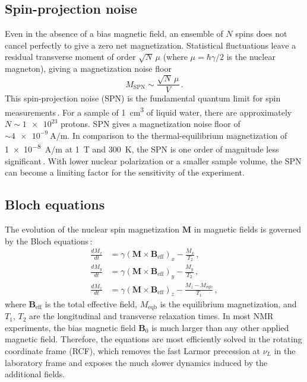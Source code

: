 \subsection{Spin-projection noise}\label{sec:intro:NMR:SPN}
Even in the absence of a bias magnetic field, an ensemble of $N$ spins does not cancel perfectly to give a zero net magnetization.
Statistical fluctuations leave a residual transverse moment of order $\sqrt{N}\,\mu$ (where $\mu = \hbar\gamma/2$ is the nuclear magneton), giving a magnetization noise floor
\begin{equation}
    M_\mathrm{SPN} \sim \frac{\sqrt{N}\,\mu}{V}
    \,.\label{eq:SPN}
\end{equation}
This spin-projection noise (SPN) is the fundamental quantum limit for spin measurements\,\cite{Bloch1946_NuclearInduction, Mitchell2020_MagSensors, Aybas_2021_Quantum_sensitivity}.
For a sample of \SI{1}{\centi\meter\cubed} of liquid water, there are approximately $N \sim \num{1e23}$ protons.
SPN gives a magnetization noise floor of $\sim \SI{4e-9}{\ampere/\meter}$.
In comparison to the thermal-equilibrium magnetization of \SI{1e-8}{\ampere/\meter} at \SI{1}{\tesla} and \SI{300}{\kelvin}, the SPN is one order of magnitude less significant\,\cite{Zhang2026_Dissertation_ipynb_1_introduction}.
With lower nuclear polarization or a smaller sample volume, the SPN can become a limiting factor for the sensitivity of the experiment.

\subsection{Bloch equations}\label{sec:intro:bloch_eq}
The evolution of the nuclear spin magnetization $\boldsymbol{M}$ in magnetic fields is governed by the Bloch equations\,\cite{Abragam1961_NuclearMagnetism}:
\begin{align}
    \frac{dM_x}{dt} &= \gamma\left(\boldsymbol{M}\times\boldsymbol{B}_\mathrm{eff}\right)_x - \frac{M_x}{T_2}
    \,,\label{eq:bloch_x}\\
    \frac{dM_y}{dt} &= \gamma\left(\boldsymbol{M}\times\boldsymbol{B}_\mathrm{eff}\right)_y - \frac{M_y}{T_2}
    \,,\label{eq:bloch_y}\\
    \frac{dM_z}{dt} &= \gamma\left(\boldsymbol{M}\times\boldsymbol{B}_\mathrm{eff}\right)_z - \frac{M_z-M_\mathrm{eqb}}{T_1}
    \,,\label{eq:bloch_z}
\end{align}
where $\boldsymbol{B}_\mathrm{eff}$ is the total effective field, $M_\mathrm{eqb}$ is the equilibrium magnetization, and $T_1$, $T_2$ are the longitudinal and transverse relaxation times.
In most NMR experiments, the bias magnetic field $\boldsymbol{B}_0$ is much larger than any other applied magnetic field.
Therefore, the equations are most efficiently solved in the rotating coordinate frame (RCF), which removes the fast Larmor precession at $\nu_L$ in the laboratory frame and exposes the much slower dynamics induced by the additional fields.

